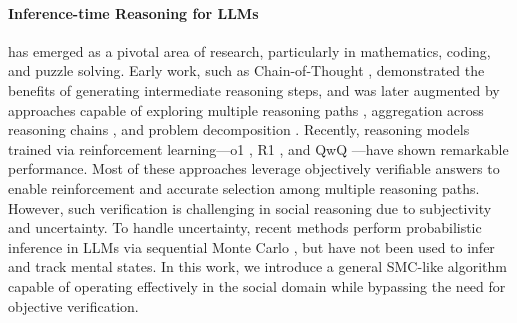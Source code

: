 \paragraph{Inference-time Reasoning for LLMs} has emerged as a pivotal area of research, particularly in mathematics, coding, and puzzle solving.
Early work, such as Chain-of-Thought \citep{wei2022chain}, demonstrated the benefits of generating intermediate reasoning steps, and was later augmented by approaches capable of exploring multiple reasoning paths \citep{yao2023tree,besta2024graph}, aggregation across reasoning chains \citep{wang2023selfconsistency}, and problem decomposition \citep{zhou2023leasttomost}.
Recently, reasoning models trained via reinforcement learning---o1 \citep{o12024openai}, R1 \citep{deepseekr12025}, and QwQ \citep{qwq-32b-preview}---have shown remarkable performance.
Most of these approaches leverage objectively verifiable answers to enable reinforcement and accurate selection among multiple reasoning paths.  However, such verification is challenging in social reasoning due to subjectivity and uncertainty. To handle uncertainty, recent methods perform probabilistic inference in LLMs via sequential Monte Carlo \citep{lew2023sequential,zhao2024probabilistic,loula2025syntactic}, but have not been used to infer and track mental states. In this work, we introduce a general SMC-like algorithm capable of operating effectively in the social domain while bypassing the need for objective verification.